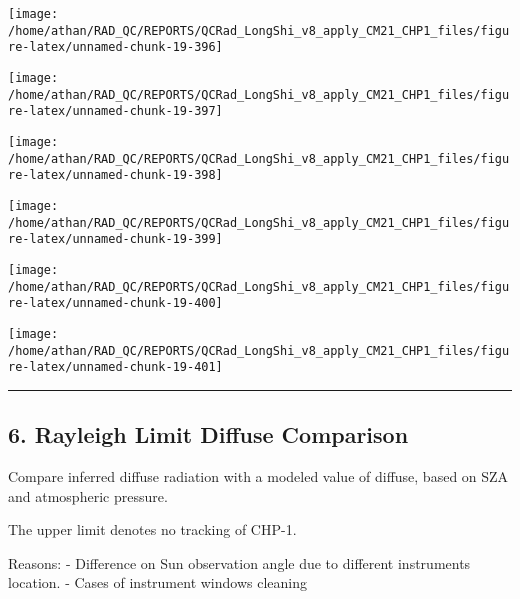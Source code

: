 \documentclass[
  10pt,
  a4paper,oneside]{article}
\begin{document}
\begin{center}\texttt{[image: /home/athan/RAD\_QC/REPORTS/QCRad\_LongShi\_v8\_apply\_CM21\_CHP1\_files/figure-latex/unnamed-chunk-19-396]} \end{center}

\begin{center}\texttt{[image: /home/athan/RAD\_QC/REPORTS/QCRad\_LongShi\_v8\_apply\_CM21\_CHP1\_files/figure-latex/unnamed-chunk-19-397]} \end{center}

\begin{center}\texttt{[image: /home/athan/RAD\_QC/REPORTS/QCRad\_LongShi\_v8\_apply\_CM21\_CHP1\_files/figure-latex/unnamed-chunk-19-398]} \end{center}

\begin{center}\texttt{[image: /home/athan/RAD\_QC/REPORTS/QCRad\_LongShi\_v8\_apply\_CM21\_CHP1\_files/figure-latex/unnamed-chunk-19-399]} \end{center}

\begin{center}\texttt{[image: /home/athan/RAD\_QC/REPORTS/QCRad\_LongShi\_v8\_apply\_CM21\_CHP1\_files/figure-latex/unnamed-chunk-19-400]} \end{center}

\begin{center}\texttt{[image: /home/athan/RAD\_QC/REPORTS/QCRad\_LongShi\_v8\_apply\_CM21\_CHP1\_files/figure-latex/unnamed-chunk-19-401]} \end{center}

\begin{center}\rule{0.5\linewidth}{0.5pt}\end{center}

\newpage

\hypertarget{rayleigh-limit-diffuse-comparison}{%
\subsection{6. Rayleigh Limit Diffuse Comparison}\label{rayleigh-limit-diffuse-comparison}}

Compare inferred diffuse radiation with a modeled value of diffuse,
based on SZA and atmospheric pressure.

The upper limit denotes no tracking of CHP-1.

Reasons:
- Difference on Sun observation angle due to different instruments location.
- Cases of instrument windows cleaning
\end{document}
